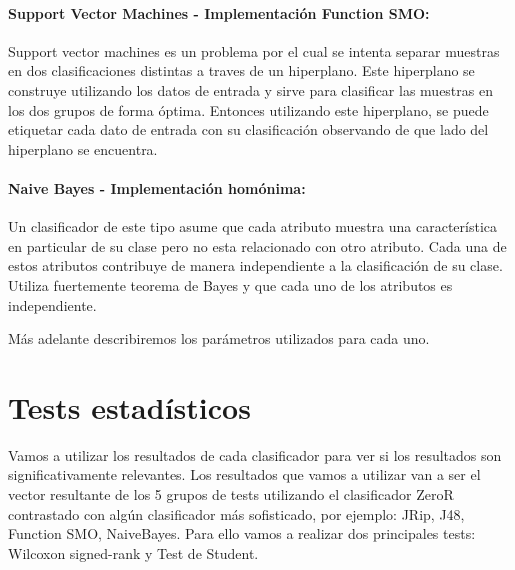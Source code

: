 \paragraph{Support Vector Machines \cite{Platt98sequentialminimal} - Implementación Function SMO:}


Support vector machines es un problema por el cual se intenta separar muestras en dos clasificaciones distintas a traves de un hiperplano. Este hiperplano se construye utilizando los datos de entrada y sirve para clasificar las muestras en los dos grupos de forma óptima. Entonces utilizando este hiperplano, se puede etiquetar cada dato de entrada con su clasificación observando de que lado del hiperplano se encuentra.

\paragraph{Naive Bayes \cite{DBLP:conf/flairs/Zhang04} - Implementación homónima:}


Un clasificador de este tipo asume que cada atributo muestra una característica en particular de su clase pero no esta relacionado con otro atributo. Cada una de estos atributos contribuye de manera independiente a la clasificación de su clase. Utiliza fuertemente teorema de Bayes y que cada uno de los atributos es independiente. 

Más adelante describiremos los parámetros utilizados para cada uno.

\section{Tests estadísticos}

Vamos a utilizar los resultados de cada clasificador para ver si los resultados son significativamente relevantes. Los resultados que vamos a utilizar van a ser el vector resultante de los 5 grupos de tests utilizando el clasificador ZeroR contrastado con algún clasificador más sofisticado, por ejemplo: JRip, J48, Function SMO, NaiveBayes.
Para ello vamos a realizar dos principales tests: Wilcoxon signed-rank y Test de Student. 

